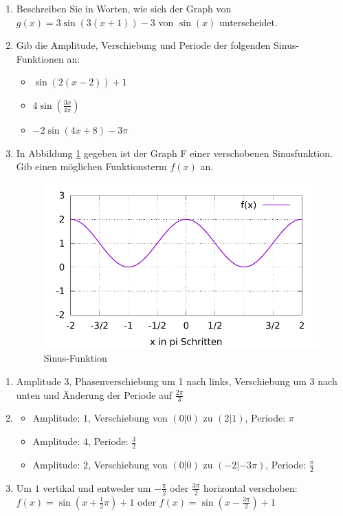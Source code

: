 	\begin{enumerate}
		\item Beschreiben Sie in Worten, wie sich der Graph von $g(x)=3\sin(3(x+1))-3$ von $\sin(x)$ unterscheidet.
		\item Gib die Amplitude, Verschiebung und Periode der folgenden Sinus-Funktionen an:
		\begin{itemize}
		\item $\sin\left(2(x-2)\right)+1$
		\item $4\sin\left(\frac{3x}{4\pi}\right)$
		\item $-2\sin\left(4x+8\right)-3\pi$
		\end{itemize}
		\item In Abbildung \ref{sinus:fig} gegeben ist der Graph F einer verschobenen Sinusfunktion. Gib einen möglichen Funktionsterm $f(x)$ an.
		\begin{figure}[h]
		\centering
		\includegraphics[scale=0.7]{Afg_sinus.pdf}
			\caption{Sinus-Funktion}
			\label{sinus:fig}
		\end{figure}
	\end{enumerate}
\begin{lsg}{}
	\begin{enumerate}
		\item Amplitude 3, Phasenverschiebung um 1 nach links, Verschiebung um 3 nach unten und Änderung der Periode auf $\frac{2\pi}{3}$
		\item \begin{itemize}
			\item Amplitude: $1$, Verschiebung von $(0|0)$ zu $(2|1)$, Periode: $\pi$
			\item Amplitude: $4$, Periode: $\frac{3}{2}$
			\item Amplitude: $2$, Verschiebung von $(0|0)$ zu $(-2|-3\pi)$, Periode: $\frac \pi 2$
		\end{itemize}
		\item Um $1$ vertikal und entweder um $-\frac{\pi}{2}$ oder $\frac{3\pi}{2}$ horizontal verschoben:\\
		$f(x)=\sin\left(x+\frac{1}{2}\pi\right)+1$ oder $f(x)=\sin\left(x-\frac{3\pi}{2}\right)+1$
	\end{enumerate}
	\end{lsg}



